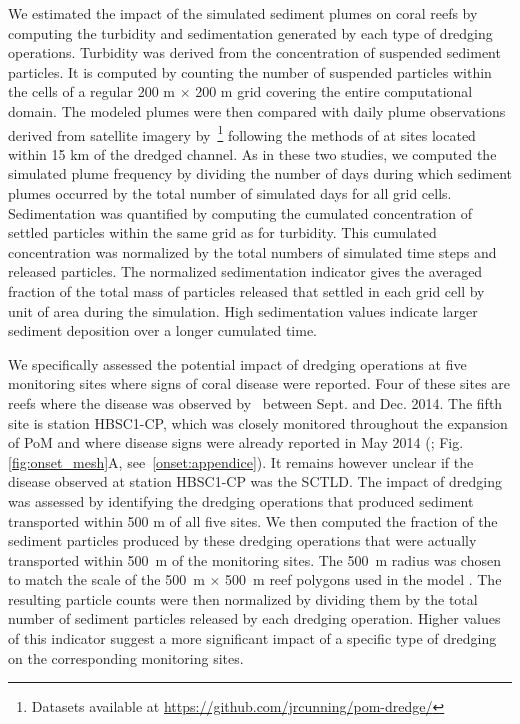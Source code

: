\documentclass[preprint,12pt,authoryear]{elsarticle}
\begin{document}
We estimated the impact of the simulated sediment plumes on coral reefs by computing the turbidity and sedimentation generated by each type of dredging operations. Turbidity was derived from the concentration of suspended sediment particles. It is computed by counting the number of suspended particles within the cells of a regular 200 m $\times$ 200 m grid covering the entire computational domain. The modeled plumes were then compared with daily plume observations derived from satellite imagery by~\cite{cunning2019extensive}\footnote{Datasets available at \url{https://github.com/jrcunning/pom-dredge/}} following the methods of \cite{barnes2015sediment} at sites located within 15 km of the dredged channel. As in these two studies, we computed the simulated plume frequency by dividing the number of days during which sediment plumes occurred by the total number of simulated days for all grid cells. Sedimentation was quantified by computing the cumulated concentration of settled particles within the same grid as for turbidity. This cumulated concentration was normalized by the total numbers of simulated time steps and released particles. The normalized sedimentation indicator gives the averaged fraction of the total mass of particles released that settled in each grid cell by unit of area during the simulation. High sedimentation values indicate larger sediment deposition over a longer cumulated time.

We specifically assessed the potential impact of dredging operations at five monitoring sites where signs of coral disease were reported. Four of these sites are reefs where the disease was observed by~\cite{precht2016unprecedented} between Sept. and Dec. 2014. The fifth site is station HBSC1-CP, which was closely monitored throughout the expansion of PoM and where disease signs were already reported in May 2014 (\citealp{dial2017}; Fig. \ref{fig:onset_mesh}A, see~\ref{onset:appendice}). It remains however unclear if the disease observed at station HBSC1-CP was the SCTLD. The impact of dredging was assessed by identifying the dredging operations that produced sediment transported within 500 m of all five sites. We then computed the fraction of the sediment particles produced by these dredging operations that were actually transported within 500~m of the monitoring sites. The 500~m radius was chosen to match the scale of the 500~m $\times$ 500~m reef polygons used in the model \citep{dobbelaere2020coupled}. The resulting particle counts were then normalized by dividing them by the total number of sediment particles released by each dredging operation. Higher values of this indicator suggest a more significant impact of a specific type of dredging on the corresponding monitoring sites.
\end{document}
